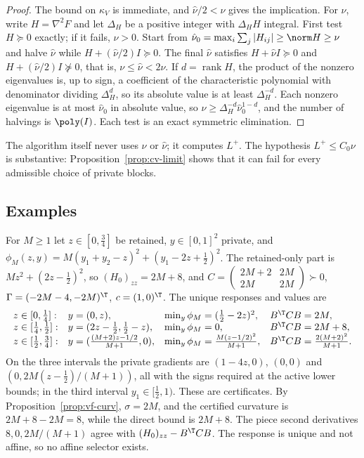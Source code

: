 \begin{proof}
The bound on $\kappa_V$ is immediate, and $\hat\nu/2<\nu$ gives the
implication. For $\hat\nu$, write $H=\nabla^2F$ and let $\Delta_H$ be a
positive integer with $\Delta_HH$ integral. First test $H\succeq0$ exactly;
if it fails, $\nu>0$. Start from $\hat\nu_0=\max_i\sum_j|H_{ij}|\ge\norm
H\ge\nu$ and halve $\hat\nu$ while $H+(\hat\nu/2)I\succeq0$. The final
$\hat\nu$ satisfies $H+\hat\nu I\succeq0$ and $H+(\hat\nu/2)I\not\succeq0$,
that is, $\nu\le\hat\nu<2\nu$. If $d=\operatorname{rank}H$, the product of
the nonzero eigenvalues is, up to sign, a coefficient of the characteristic
polynomial with denominator dividing $\Delta_H^d$, so its absolute value is
at least $\Delta_H^{-d}$. Each nonzero eigenvalue is at most $\hat\nu_0$ in
absolute value, so $\nu\ge\Delta_H^{-d}\hat\nu_0^{1-d}$, and the number of
halvings is $\poly(I)$. Each test is an exact symmetric elimination.
\end{proof}

The algorithm itself never uses $\nu$ or $\hat\nu$; it computes $L^+$. The
hypothesis $L^+\le C_0\nu$ is substantive: Proposition~\ref{prop:cv-limit}
shows that it can fail for every admissible choice of private blocks.

\subsection{Examples}

\begin{example}\label{ex:cv-fm}
For $M\ge1$ let $z\in[0,\frac34]$ be retained, $y\in[0,1]^2$ private, and
$\phi_M(z,y)=M(y_1+y_2-z)^2+(y_1-2z+\frac12)^2$. The retained-only part is
$Mz^2+(2z-\frac12)^2$, so $(H_0)_{zz}=2M+8$, and
$C=\left(\begin{smallmatrix}2M+2&2M\\2M&2M\end{smallmatrix}\right)\succ0$,
$\Gamma=(-2M-4,-2M)^{\T}$, $c=(1,0)^{\T}$. The unique responses and values
are
\[
\begin{array}{llll}
z\in[0,\tfrac14]:& y=(0,z),& \min_y\phi_M=(\tfrac12-2z)^2,& B^{\T}CB=2M,\\
z\in[\tfrac14,\tfrac12]:& y=(2z-\tfrac12,\tfrac12-z),& \min_y\phi_M=0,& B^{\T}CB=2M+8,\\
z\in[\tfrac12,\tfrac34]:& y=(\tfrac{(M+2)z-1/2}{M+1},0),& \min_y\phi_M=\tfrac{M(z-1/2)^2}{M+1},
& B^{\T}CB=\tfrac{2(M+2)^2}{M+1}.
\end{array}
\]
On the three intervals the private gradients are $(1-4z,0)$, $(0,0)$ and
$(0,2M(z-\frac12)/(M+1))$, all with the signs required at the active lower
bounds; in the third interval $y_1\in[\frac12,1)$. These are certificates.
By Proposition~\ref{prop:vf-curv}, $\sigma=2M$, and the certified curvature
is $2M+8-2M=8$, while the direct bound is $2M+8$. The piece second
derivatives $8,0,2M/(M+1)$ agree with $(H_0)_{zz}-B^{\T}CB$. The response is
unique and not affine, so no affine selector exists.
\end{example}

